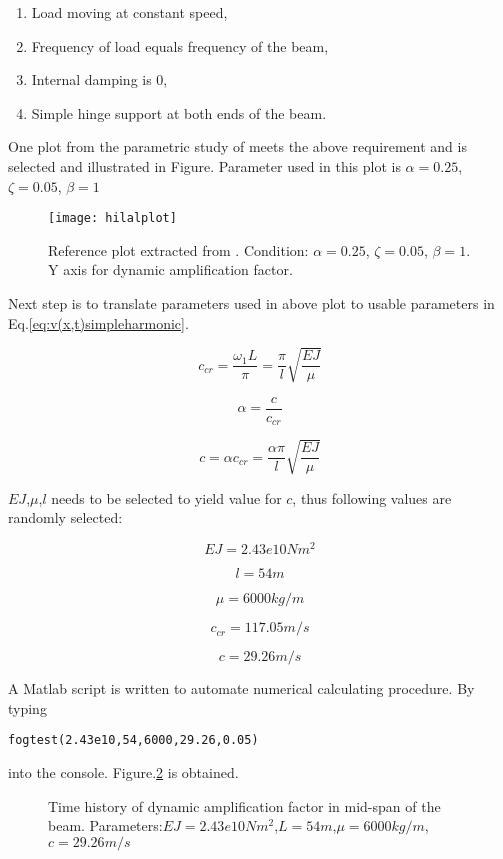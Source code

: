 \begin{enumerate}
    \item Load moving at constant speed,
    \item Frequency of load equals frequency of the beam,
    \item Internal damping is 0,
    \item Simple hinge support at both ends of the beam.
\end{enumerate}

One plot from the parametric study of \cite{abu2000vibration} meets the above requirement and is selected and illustrated in Figure. Parameter used in this plot is $\alpha = 0.25$, $\zeta = 0.05$, $\beta  = 1$

\begin{figure}[h!]
    \centering
    \texttt{[image: hilalplot]}
    \caption{Reference plot extracted from \cite{abu2000vibration}. Condition: $\alpha = 0.25$, $\zeta = 0.05$, $\beta  = 1$. Y axis for dynamic amplification factor.}
    \label{fig:hilalplot}
\end{figure}

Next step is to translate parameters used in above plot to usable parameters in Eq.\ref{eq:v(x,t)simpleharmonic}.


$$c_{cr} = \frac{\omega_1 L}{\pi} = \frac{\pi}{l}\sqrt{\frac{EJ}{\mu}}$$

$$\alpha = \frac{c}{c_{cr}}$$

$$c = \alpha c_{cr} = \frac{\alpha\pi}{l}\sqrt{\frac{EJ}{\mu}}$$

$EJ$,$\mu$,$l$ needs to be selected to yield value for $c$, thus following values are randomly selected:

$$EJ = 2.43e10 Nm^2$$

$$l = 54m$$

$$\mu = 6000 kg/m$$

$$c_{cr} = 117.05 m/s$$

$$ c = 29.26 m/s $$

A Matlab script is written to automate numerical calculating procedure. By typing 

\texttt{fogtest(2.43e10,54,6000,29.26,0.05)}

into the console. Figure.\ref{fig:EJ24300000000L54mu6000c29daf.tikz} is obtained.

\begin{figure}[h!]
\centering 
\newlength\figureheight 
\newlength\figurewidth 
\setlength\figureheight{6cm} 
\setlength\figurewidth{6cm} 
 
\caption{Time history of dynamic amplification factor in mid-span of the beam. Parameters:$EJ=2.43e10Nm^2$,$L=54m$,$\mu=6000kg/m$,$c=29.26m/s$} 
\label{fig:EJ24300000000L54mu6000c29daf.tikz} 
\end{figure}

